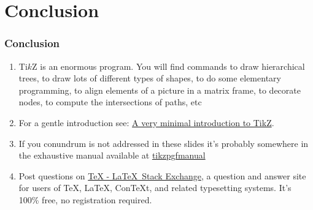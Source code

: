%
%
\section{
  Conclusion
}

%
%
\begin{frame}
  \frametitle{
    Conclusion
  }

  \begin{enumerate}
  \item
    Ti$k$Z is an enormous program. You will find commands to draw hierarchical trees, to draw lots of different types of shapes, to do some elementary programming, to align elements of a picture in a matrix frame, to decorate nodes, to compute the intersections of paths, etc
  \item
     For a gentle introduction see: \href{http://cremeronline.com/LaTeX/minimaltikz.pdf}{A very minimal introduction to TikZ}.
  \item
    If you conundrum is not addressed in these slides it's probably somewhere in the exhaustive manual available at \href{http://paws.wcu.edu/tsfoguel/tikzpgfmanual.pdf}{tikzpgfmanual}
  \item
    Post questions on \href{http://tex.stackexchange.com/}{TeX - \LaTeX\ Stack Exchange}, a question and answer site for users of TeX, \LaTeX, ConTeXt, and related typesetting systems. It's 100\% free, no registration required. 
  \end{enumerate}
  
\end{frame}
